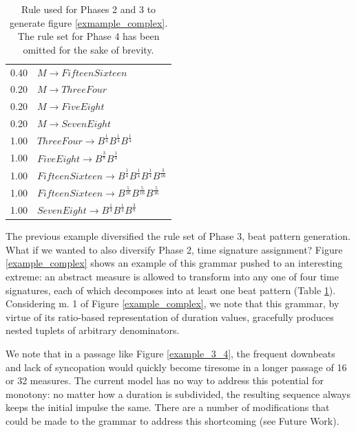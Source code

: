 \documentclass{article}
\begin{document}
\begin{table}
\centering
\begin{tabular}{ll}
0.40 & $M \rightarrow FifteenSixteen$\\
0.20 & $M \rightarrow ThreeFour$\\
0.20 & $M \rightarrow FiveEight$\\
0.20 & $M \rightarrow SevenEight$\\
1.00 & $ThreeFour \rightarrow B^\frac{1}{4} B^\frac{1}{4} B^\frac{1}{4}$\\
1.00 & $FiveEight \rightarrow B^\frac{3}{8} B^\frac{1}{4}$\\
1.00 & $FifteenSixteen \rightarrow B^\frac{1}{4} B^\frac{1}{4} B^\frac{1}{4} B^\frac{3}{16}$\\
1.00 & $FifteenSixteen \rightarrow B^\frac{5}{16} B^\frac{5}{16} B^\frac{5}{16}$\\
1.00 & $SevenEight \rightarrow B^\frac{1}{4} B^\frac{1}{4} B^\frac{3}{8}$\\
\end{tabular}
\caption{Rule used for Phases 2 and 3 to generate figure \ref{exmample_complex}. The rule set for Phase 4 has been omitted for the sake of brevity.}\label{complex_rules_phases23}
\end{table}

The previous example diversified the rule set of Phase 3, beat pattern generation. What if we wanted to also diversify Phase 2, time signature assignment? Figure \ref{example_complex} shows an example of this grammar pushed to an interesting extreme: an abstract measure is allowed to transform into any one of four time signatures, each of which decomposes into at least one beat pattern (Table \ref{complex_rules_phases23}). Considering m. 1 of Figure \ref{example_complex}, we note that this grammar, by virtue of its ratio-based representation of duration values, gracefully produces nested tuplets of arbitrary denominators.

We note that in a passage like Figure \ref{example_3_4}, the frequent downbeats and lack of syncopation would quickly become tiresome in a longer passage of 16 or 32 measures. The current model has no way to address this potential for monotony: no matter how a duration is subdivided, the resulting sequence always keeps the initial impulse the same. There are a number of modifications that could be made to the grammar to address this shortcoming (see Future Work).

\end{document}

